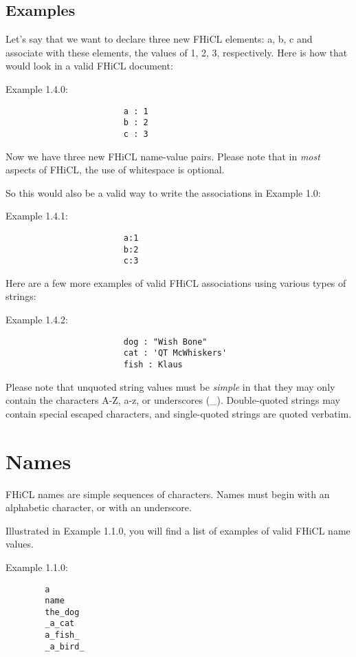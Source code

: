 \documentclass{memarticle}
\begin{document}
        \section{Examples}
                Let's say that we want to declare three new FHiCL elements: a, b, c
                and associate with these elements, the values of 1, 2, 3, respectively.
                Here is how that would look in a valid FHiCL document:
                \par
                Example 1.4.0:
                \begin{verbatim}
                        a : 1
                        b : 2
                        c : 3
                \end{verbatim}
                \par
                Now we have three new FHiCL name-value pairs.
                Please note that in \emph{most} aspects of FHiCL,
                the use of whitespace is optional.
                \par
                So this would also be a valid way to write the associations in Example 1.0:
                \par
                Example 1.4.1:
                \begin{verbatim}
                        a:1
                        b:2
                        c:3
                \end{verbatim}
                \par
                Here are a few more examples of valid FHiCL associations using various types of strings:
                \par
                Example 1.4.2:
                \begin{verbatim}
                        dog : "Wish Bone"
                        cat : 'QT McWhiskers'
                        fish : Klaus
                \end{verbatim}
                Please note that unquoted string values must be \emph{simple} in that they may only contain
                the characters A-Z, a-z, or underscores (\_).
                Double-quoted strings may contain special escaped characters,
                and single-quoted strings are quoted verbatim.

\chapter{Names}
	FHiCL names are simple sequences of characters.
	Names must begin with an alphabetic character,
	or with an underscore.
	\par
	Illustrated in Example 1.1.0,
	you will find a list of examples of valid FHiCL name values.
	\par
	Example 1.1.0:
	\begin{verbatim}
		a
		name
		the_dog
		_a_cat
		a_fish_
		_a_bird_
	\end{verbatim}
\end{document}
